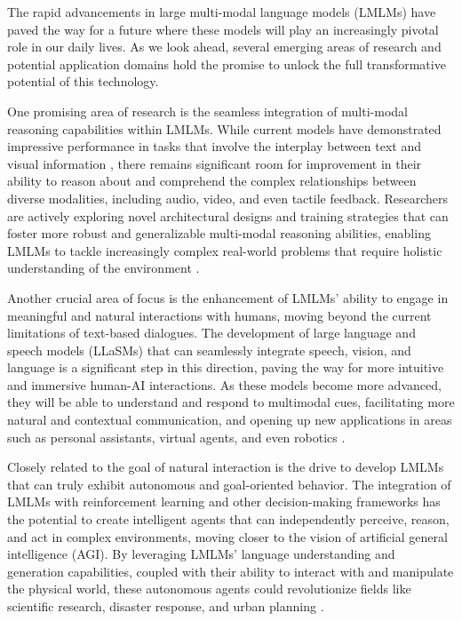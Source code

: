 \documentclass[11pt]{article}
\begin{document}
The rapid advancements in large multi-modal language models (LMLMs) have paved the way for a future where these models will play an increasingly pivotal role in our daily lives. As we look ahead, several emerging areas of research and potential application domains hold the promise to unlock the full transformative potential of this technology.

One promising area of research is the seamless integration of multi-modal reasoning capabilities within LMLMs. While current models have demonstrated impressive performance in tasks that involve the interplay between text and visual information \cite{ref6}, there remains significant room for improvement in their ability to reason about and comprehend the complex relationships between diverse modalities, including audio, video, and even tactile feedback. Researchers are actively exploring novel architectural designs and training strategies that can foster more robust and generalizable multi-modal reasoning abilities, enabling LMLMs to tackle increasingly complex real-world problems that require holistic understanding of the environment \cite{ref48}.

Another crucial area of focus is the enhancement of LMLMs' ability to engage in meaningful and natural interactions with humans, moving beyond the current limitations of text-based dialogues. The development of large language and speech models (LLaSMs) that can seamlessly integrate speech, vision, and language \cite{ref221} is a significant step in this direction, paving the way for more intuitive and immersive human-AI interactions. As these models become more advanced, they will be able to understand and respond to multimodal cues, facilitating more natural and contextual communication, and opening up new applications in areas such as personal assistants, virtual agents, and even robotics \cite{ref374}.

Closely related to the goal of natural interaction is the drive to develop LMLMs that can truly exhibit autonomous and goal-oriented behavior. The integration of LMLMs with reinforcement learning and other decision-making frameworks \cite{ref375} has the potential to create intelligent agents that can independently perceive, reason, and act in complex environments, moving closer to the vision of artificial general intelligence (AGI). By leveraging LMLMs' language understanding and generation capabilities, coupled with their ability to interact with and manipulate the physical world, these autonomous agents could revolutionize fields like scientific research, disaster response, and urban planning \cite{ref101,ref376}.
\end{document}
